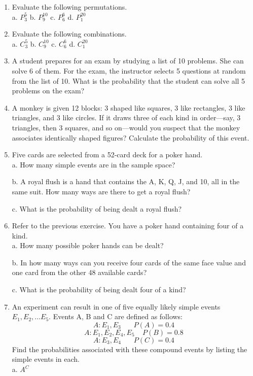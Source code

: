 \documentclass{article}
\begin{document}
\begin{enumerate}
\item Evaluate the following permutations. \\

 a. $P_3^5$    b. $P_9^{10}$    c. $P_6^6$    d. $P_1^{20}$ \\

\item Evaluate the following combinations. \\

 a. $C_3^5$    b. $C_9^{10}$    c. $C_6^6$    d. $C_1^{20}$ \\

\item A student prepares for an exam by studying a list of 10 problems. She can solve 6 of them. For the exam, the instructor selects 5 questions at random from the list of 10. What is the probability that the student can solve all 5 problems on the exam?

\item A monkey is given 12 blocks: 3 shaped like squares, 3 like rectangles, 3 like triangles, and 3 like circles. If it draws three of each kind in order—say, 3 triangles, then 3 squares, and so on—would you suspect that the monkey associates identically shaped figures? Calculate the probability of this event.

\item Five cards are selected from a 52-card deck for a poker hand. \\ 
a. How many simple events are in the sample space?

b. A royal flush is a hand that contains the A, K, Q, J, and 10, all in the same suit. How many ways are there to get a royal flush?

c. What is the probability of being dealt a royal flush?

\item Refer to the previous exercise. You have a poker hand containing four of a kind. \\ 
a. How many possible poker hands can be dealt?

b. In how many ways can you receive four cards of the same face value and one card from the other 48 available cards?

c. What is the probability of being dealt four of a kind?

\item An experiment can result in one of five equally likely simple events $E_1,E_2,...E_5.$ Events A, B and C are defined as follows: \\ 
$$ A:E_1,E_3 \:\:\:\:\:\:\:\: P(A) = 0.4 $$
$$ A:E_1,E_2,E_4,E_5 \:\:\:\:\: P(B) = 0.8 $$
$$ A:E_3,E_4 \:\:\:\:\:\:\:\: P(C) = 0.4 $$
Find the probabilities associated with these compound events by listing the simple events in each. \\
a. $A^C$


\end{enumerate}
\end{document}
